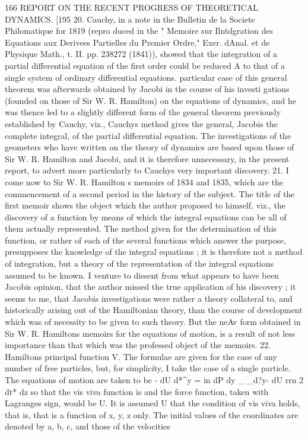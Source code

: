 \documentclass[11pt,a4paper]{book}
\begin{document}

166 REPORT ON THE RECENT PROGRESS OF THEORETICAL DYNAMICS.
[195
20. Cauchy, in a note in the Bulletin de la Societe Philomatique for 1819 (repro
duced in the " Memoire sur Ilntdgration des Equations aux Derivees Partielles du
Premier Ordre," Exer. dAnal. et de Physique Math., t. II. pp. 238272 (1841)), showed
that the integration of a partial differential equation of the first order could be reduced
A
to that of a single system of ordinary differential equations. particular case of
this general theorem was afterwards obtained by Jacobi in the course of his investi
gations (founded on those of Sir W. R. Hamilton) on the equations of dynamics, and
he was thence led to a slightly different form of the general theorem previously
established by Cauchy, viz., Cauchys method gives the general, Jacobis the complete
integral, of the partial differential equation. The investigations of the geometers who
have written on the theory of dynamics are based upon those of Sir W. R. Hamilton
and Jacobi, and it is therefore unnecessary, in the present report, to advert more
particularly to Cauchys very important discovery.
21. I come now to Sir W. R. Hamilton s memoirs of 1834 and 1835, which are
the commencement of a second period in the history of the subject. The title of the
first memoir shows the object which the author proposed to himself, viz., the discovery
of a function by means of which the integral equations can be all of them actually
represented. The method given for the determination of this function, or rather of
each of the several functions which answer the purpose, presupposes the knowledge of
the integral equations ; it is therefore not a method of integration, but a theory of
the representation of the integral equations assumed to be known. I venture to
dissent from what appears to have been Jacobis opinion, that the author missed the
true application of his discovery ; it seems to me, that Jacobis investigations were
rather a theory collateral to, and historically arising out of the Hamiltonian theory,
than the course of development which was of necessity to be given to such theory.
But the neAv form obtained in Sir W. R. Hamiltons memoirs for the equations of
motion, is a result of not less importance than that which was the professed object
of the memoirs.
22. Hamiltons principal function V. The formulae are given for the case of any
number of free particles, but, for simplicity, I take the case of a single particle. The
equations of motion are taken to be
-
dU
d*^y =
in
dP dy
_
_d?y- dU
rrn 2
dt* dz
so that the vis viva function is
and the force function, taken with Lagranges sign, would be U. It is assumed
U
that the condition of vis viva holds, that is, that is a function of x, y, z only.
The initial values of the coordinates are denoted by a, b, c, and those of the velocities
\end{document}
